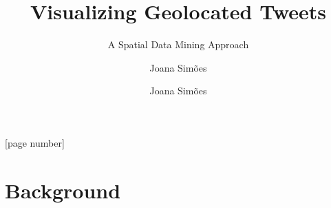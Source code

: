 \documentclass[hyperref={pdfpagelabels=true}]{beamer}
\title{Visualizing Geolocated Tweets}
\subtitle{A Spatial Data Mining Approach}
\author{Joana Sim\~{o}es}
\author[shortname]{Joana Sim\~{o}es \inst{1}}
\institute[shortinst]{\inst{1} Eurecat, Centre Tecnologic de Catalunya}
\begin{document}
[page number]
\begin{frame}
\titlepage


\end{frame} 
  

\section{Background} 
\end{document}

